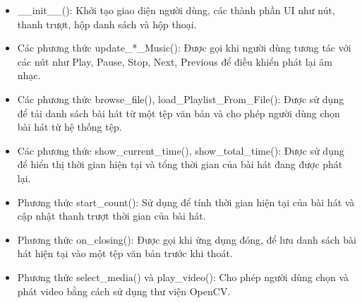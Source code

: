 \documentclass[a4paper]{article}
\begin{document}
\begin{itemize}
    \item \_\_init\_\_(): Khởi tạo giao diện người dùng, các thành phần UI như nút, thanh trượt, hộp danh sách và hộp thoại.
    \item Các phương thức update\_*\_Music(): Được gọi khi người dùng tương tác với các nút như Play, Pause, Stop, Next, Previous để điều khiển phát lại âm nhạc.
    \item Các phương thức browse\_file(), load\_Playlist\_From\_File(): Được sử dụng để tải danh sách bài hát từ một tệp văn bản và cho phép người dùng chọn bài hát từ hệ thống tệp.
    \item Các phương thức show\_current\_time(), show\_total\_time(): Được sử dụng để hiển thị thời gian hiện tại và tổng thời gian của bài hát đang được phát lại.
    \item Phương thức start\_count(): Sử dụng để tính thời gian hiện tại của bài hát và cập nhật thanh trượt thời gian của bài hát.
    \item Phương thức on\_closing(): Được gọi khi ứng dụng đóng, để lưu danh sách bài hát hiện tại vào một tệp văn bản trước khi thoát.
    \item Phương thức select\_media() và play\_video(): Cho phép người dùng chọn và phát video bằng cách sử dụng thư viện OpenCV.
\end{itemize}
\end{document}
